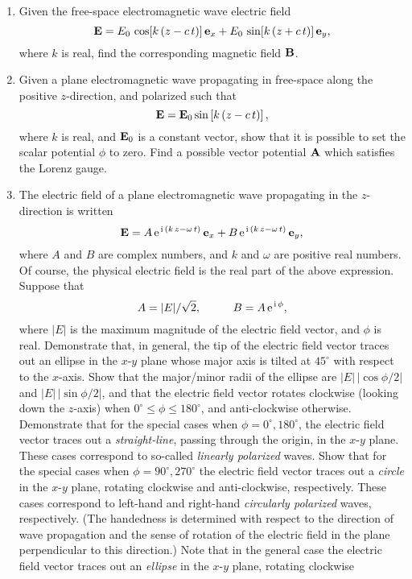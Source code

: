 {\begin{enumerate}
\item Given the free-space electromagnetic wave electric field
$$
{\bf E} = E_0\,\cos[k\,(z-c\,t)]\,{\bf e}_x
+ E_0\,\sin[k\,(z+c\,t)]\,{\bf e}_y,
$$
where $k$ is real, find the corresponding magnetic field ${\bf B}$.
\item Given a plane  electromagnetic wave propagating in free-space along the positive $z$-direction, and polarized such that
$$
{\bf E} = {\bf E}_0 \sin\left[k\,(z-c\,t)\right],
$$
where $k$ is real, and ${\bf E}_0$ is a constant vector,
show that it is possible to set the scalar potential $\phi$ to zero. Find a possible vector potential ${\bf A}$ which satisfies the Lorenz gauge. 
\item The electric field of a plane electromagnetic wave propagating
in the $z$-direction is written
$$
{\bf E} = A\,{\rm e}^{\,{\rm i}\,(k\,z-\omega\,t)}\,{\bf e}_x
+ B\,{\rm e}^{\,{\rm i}\,(k\,z-\omega\,t)}\,{\bf e}_y,
$$
where $A$ and $B$ are  complex numbers, and
$k$ and $\omega$ are positive real numbers. Of course, the
physical electric field is the real part of the above expression. Suppose
that
$$
A = |E|/\sqrt{2},\mbox{\hspace{1cm}}B = A\, {\rm e}^{\,{\rm i}\,\phi},
$$
where $|E|$ is the maximum magnitude of the electric field vector, and $\phi$ is real.
Demonstrate that, in general, the tip of the electric field vector traces
out an ellipse in the $x$-$y$ plane whose major axis is tilted
at $45^\circ$ with respect to the $x$-axis. Show that the major/minor
radii of the ellipse are $|E|\,|\!\cos\phi/2|$ and $|E|\,|\!\sin\phi/2|$, and
that the electric field vector rotates clockwise (looking down the $z$-axis)
when $0^\circ\leq\phi\leq 180^\circ$, and anti-clockwise otherwise.
Demonstrate that for the special cases when $\phi=0^\circ, 180^\circ$,
the electric field vector traces out a {\em straight-line}, passing through the
origin, in the $x$-$y$ plane. These cases correspond to so-called {\em linearly polarized}\/
waves. Show that for the special cases when $\phi=90^\circ, 270^\circ$
the electric field vector traces out a {\em circle}\/ in the $x$-$y$
plane, rotating clockwise and anti-clockwise, respectively. These
 cases correspond to left-hand and right-hand {\em circularly polarized}\/
waves, respectively. (The handedness is determined with respect to
the direction of wave propagation and the sense of rotation of the
electric field in the plane perpendicular to this direction.) Note that in the general case the electric field vector traces
out an {\em ellipse}\/ in the $x$-$y$ plane, rotating clockwise

\end{enumerate}}
